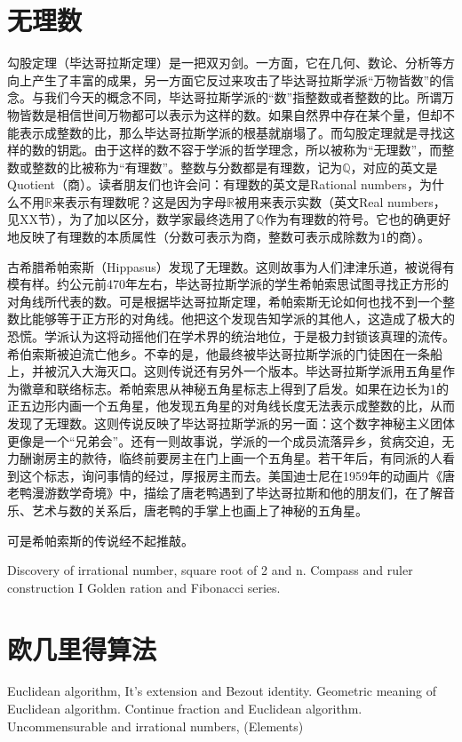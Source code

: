 \documentclass[b5paper]{ctexart}
\begin{document}
\section{无理数}
勾股定理（毕达哥拉斯定理）是一把双刃剑。一方面，它在几何、数论、分析等方向上产生了丰富的成果，另一方面它反过来攻击了毕达哥拉斯学派“万物皆数”的信念。与我们今天的概念不同，毕达哥拉斯学派的“数”指整数或者整数的比。所谓万物皆数是相信世间万物都可以表示为这样的数。如果自然界中存在某个量，但却不能表示成整数的比，那么毕达哥拉斯学派的根基就崩塌了。而勾股定理就是寻找这样的数的钥匙。由于这样的数不容于学派的哲学理念，所以被称为“无理数”，而整数或整数的比被称为“有理数”。整数与分数都是有理数，记为$\mathbb{Q}$，对应的英文是Quotient（商）。读者朋友们也许会问：有理数的英文是Rational numbers，为什么不用$\mathbb{R}$来表示有理数呢？这是因为字母$\mathbb{R}$被用来表示实数（英文Real numbers，见XX节），为了加以区分，数学家最终选用了$\mathbb{Q}$作为有理数的符号。它也的确更好地反映了有理数的本质属性（分数可表示为商，整数可表示成除数为1的商）。

古希腊希帕索斯（Hippasus）发现了无理数。这则故事为人们津津乐道，被说得有模有样。约公元前470年左右，毕达哥拉斯学派的学生希帕索思试图寻找正方形的对角线所代表的数。可是根据毕达哥拉斯定理，希帕索斯无论如何也找不到一个整数比能够等于正方形的对角线。他把这个发现告知学派的其他人，这造成了极大的恐慌。学派认为这将动摇他们在学术界的统治地位，于是极力封锁该真理的流传。希伯索斯被迫流亡他乡。不幸的是，他最终被毕达哥拉斯学派的门徒困在一条船上，并被沉入大海灭口。这则传说还有另外一个版本。毕达哥拉斯学派用五角星作为徽章和联络标志。希帕索思从神秘五角星标志上得到了启发。如果在边长为1的正五边形内画一个五角星，他发现五角星的对角线长度无法表示成整数的比，从而发现了无理数。这则传说反映了毕达哥拉斯学派的另一面：这个数字神秘主义团体更像是一个“兄弟会”。还有一则故事说，学派的一个成员流落异乡，贫病交迫，无力酬谢房主的款待，临终前要房主在门上画一个五角星。若干年后，有同派的人看到这个标志，询问事情的经过，厚报房主而去\cite{HanXueTao16}。美国迪士尼在1959年的动画片《唐老鸭漫游数学奇境》中，描绘了唐老鸭遇到了毕达哥拉斯和他的朋友们，在了解音乐、艺术与数的关系后，唐老鸭的手掌上也画上了神秘的五角星。

可是希帕索斯的传说经不起推敲。

Discovery of irrational number, square root of 2 and n.
Compass and ruler construction I
Golden ration and Fibonacci series.

\section{欧几里得算法}
Euclidean algorithm,
It's extension and Bezout identity.
Geometric meaning of Euclidean algorithm.
Continue fraction and Euclidean algorithm.
Uncommensurable and irrational numbers, (Elements)
\end{document}
